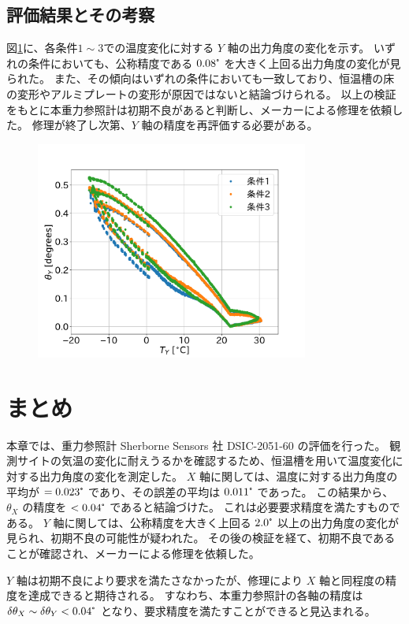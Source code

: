 \documentclass[../../main.tex]{subfiles}
\begin{document}
\subsection{評価結果とその考察}
図\ref{fig:angleY_huryou_test}に、各条件$1\sim3$での温度変化に対する $Y$ 軸の出力角度の変化を示す。
いずれの条件においても、公称精度である $0.08\tcdegree$ を大きく上回る出力角度の変化が見られた。
また、その傾向はいずれの条件においても一致しており、恒温槽の床の変形やアルミプレートの変形が原因ではないと結論づけられる。
以上の検証をもとに本重力参照計は初期不良があると判断し、メーカーによる修理を依頼した。
修理が終了し次第、$Y$ 軸の精度を再評価する必要がある。
\begin{figure}[H]
    \centering
    \includegraphics[width=0.8\textwidth]{tiltsensor/angleY_huryou_test.pdf}
    \label{fig:angleY_huryou_test}
\end{figure}
\section{まとめ}
本章では、重力参照計 Sherborne Sensors 社 DSIC-2051-60 の評価を行った。
観測サイトの気温の変化に耐えうるかを確認するため、恒温槽を用いて温度変化に対する出力角度の変化を測定した。
$X$ 軸に関しては、温度に対する出力角度の平均が $=0.023\tcdegree$ であり、その誤差の平均は $0.011\tcdegree$ であった。
この結果から、 $\theta_{X}$ の精度を $<0.04\tcdegree$ であると結論づけた。
これは必要要求精度を満たすものである。
$Y$ 軸に関しては、公称精度を大きく上回る $2.0\tcdegree$ 以上の出力角度の変化が見られ、初期不良の可能性が疑われた。
その後の検証を経て、初期不良であることが確認され、メーカーによる修理を依頼した。

$Y$ 軸は初期不良により要求を満たさなかったが、修理により $X$ 軸と同程度の精度を達成できると期待される。
すなわち、本重力参照計の各軸の精度は $\delta\theta_X\sim\delta\theta_Y<0.04\tcdegree$ となり、要求精度を満たすことができると見込まれる。
\end{document}

